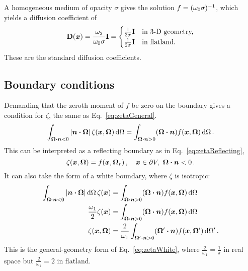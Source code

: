 A homogeneous medium of opacity $\sigma$ gives the solution
$f=(\omega_0\sigma)^{-1}$, which yields a diffusion coefficient of
\begin{equation*}
  \mathbf{D}(\bm{x}) = \frac{\omega_2}{\omega_0 \sigma} \mathbf{I}
  =
  \begin{cases}
    \frac{1}{3\sigma} \mathbf{I} & \text{in 3-D geometry,} \\ 
    \frac{1}{2\sigma} \mathbf{I} & \text{in flatland.}
  \end{cases}
\end{equation*}
These are the standard diffusion coefficients.

\subsection{Boundary conditions}

Demanding that the zeroth moment of $f$ be zero on the boundary gives a
condition for $\zeta$, the same as Eq.~\eqref{eq:zetaGeneral}.
\begin{equation*}
  \int_{\bm{\Omega} \bm{\cdot} \bm{n} < 0}
  \left| \bm{n} \bm{\cdot} \bm{\Omega} \right| \zeta(\bm{x}, \bm{\Omega}) \mathop{}\!\mathrm{d}\Omega
  = \int_{\bm{\Omega} \bm{\cdot} \bm{n} > 0}
  (\bm{\Omega} \bm{\cdot} \bm{n} ) f(\bm{x}, \bm{\Omega}) \mathop{}\!\mathrm{d}\Omega\,.  
\end{equation*}
This can be interpreted as a reflecting boundary as in
Eq.~\eqref{eq:zetaReflecting}, 
\begin{equation*}
  \zeta(\bm{x}, \bm{\Omega}) = f(\bm{x}, \bm{\Omega}_r) \,,
 \quad \bm{x} \in \partial V, \ \bm{\Omega} \bm{\cdot} \bm{n} < 0 \,.
\end{equation*}
It can also take the form of a white boundary, where $\zeta$ is isotropic:
\begin{align*}
  \int_{\bm{\Omega} \bm{\cdot} \bm{n} < 0}
  \left| \bm{n} \bm{\cdot} \bm{\Omega} \right| \mathop{}\!\mathrm{d}\Omega\, \zeta(\bm{x}) 
  &= \int_{\bm{\Omega} \bm{\cdot} \bm{n} > 0}
  (\bm{\Omega} \bm{\cdot} \bm{n} ) f(\bm{x}, \bm{\Omega}) \mathop{}\!\mathrm{d}\Omega
  \\
  \frac{\omega_1}{2} \zeta(\bm{x}) 
  &= \int_{\bm{\Omega} \bm{\cdot} \bm{n} > 0}
  (\bm{\Omega} \bm{\cdot} \bm{n} ) f(\bm{x}, \bm{\Omega}) \mathop{}\!\mathrm{d}\Omega
  \\
  \zeta(\bm{x},\bm{\Omega})
  &= \frac{2}{\omega_1} \int_{\bm{\Omega}' \bm{\cdot} \bm{n} > 0}
  (\bm{\Omega}' \bm{\cdot} \bm{n} ) f(\bm{x}, \bm{\Omega}') \mathop{}\!\mathrm{d}\Omega'\,.
\end{align*}
This is the general-geometry form of Eq.~\eqref{eq:zetaWhite}, where
$\frac{2}{\omega_1}=\frac{1}{\pi}$ in real space but $\frac{2}{\omega_1}=2$ in
flatland.

